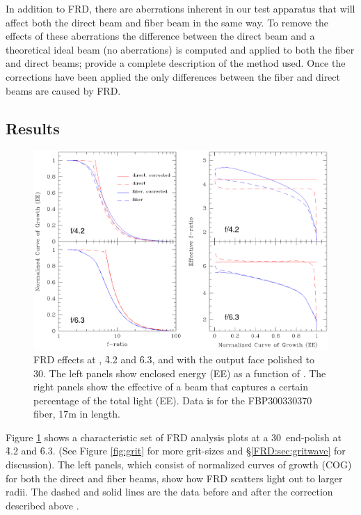 In addition to FRD, there are aberrations inherent in our test
apparatus that will affect both the direct beam and fiber beam in the
same way. To remove the effects of these aberrations the difference
between the direct beam and a theoretical ideal beam (no aberrations)
is computed and applied to both the fiber and direct beams;
\citet{Crause_08} provide a complete description of the method
used. Once the corrections have been applied the only differences
between the fiber and direct beams are caused by FRD.

\subsection{Results}
\label{FRD:sec:results}

\begin{figure}[ht]
\begin{center}
\includegraphics[width=\textwidth, trim=0 2.6in 0 0, clip=true]{FRD/figs/basic_FRD.eps}
\caption[Example FRD analysis plots]{\fixspacing\label{fig:basicFRD} FRD
  effects at \filty, \f4.2 and \f6.3, and with the output face polished to
  30\mum. The left panels show enclosed energy (EE) as a function of
  \fratio. The right panels show the effective \fratio of a beam that captures
  a certain percentage of the total light (EE). Data is for the FBP300330370
  fiber, 17m in length.}
\end{center}
\end{figure}

Figure \ref{fig:basicFRD} shows a characteristic set of FRD analysis
plots at a 30\mum\ end-polish at \f4.2 and \f6.3.  (See Figure
\ref{fig:grit} for more grit-sizes and \S\ref{FRD:sec:gritwave} for
discussion).  The left panels, which consist of normalized curves of
growth (COG) for both the direct and fiber beams, show how FRD
scatters light out to larger radii. The dashed and solid lines are the
data before and after the correction described above \citep{Crause_08}.

